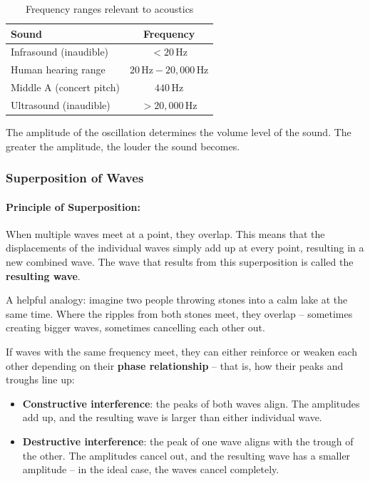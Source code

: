 \begin{table}[h]
\centering
\begin{tabular}{|l|c|}
\hline
\textbf{Sound} & \textbf{Frequency} \\
\hline
Infrasound (inaudible) & $< 20\,\text{Hz}$ \\
Human hearing range   & $20\,\text{Hz} - 20{,}000\,\text{Hz}$ \\
Middle A (concert pitch) & $440\,\text{Hz}$ \\
Ultrasound (inaudible) & $> 20{,}000\,\text{Hz}$ \\
\hline
\end{tabular}
\caption{Frequency ranges relevant to acoustics}
\label{tab:frequencies}
\end{table}
The amplitude of the oscillation determines the volume level of the sound. The greater the amplitude, the louder the sound becomes.

\subsubsection{Superposition of Waves}

\paragraph{Principle of Superposition:}
When multiple waves meet at a point, they overlap. This means that the displacements of the individual waves simply add up at every point, resulting in a new combined wave. The wave that results from this superposition is called the \textbf{resulting wave}.

A helpful analogy: imagine two people throwing stones into a calm lake at the same time. Where the ripples from both stones meet, they overlap -- sometimes creating bigger waves, sometimes cancelling each other out.

If waves with the same frequency meet, they can either reinforce or weaken each other depending on their \textbf{phase relationship} -- that is, how their peaks and troughs line up:

\begin{itemize}
    \item \textbf{Constructive interference}: the peaks of both waves align. The amplitudes add up, and the resulting wave is larger than either individual wave.
    \item \textbf{Destructive interference}: the peak of one wave aligns with the trough of the other. The amplitudes cancel out, and the resulting wave has a smaller amplitude -- in the ideal case, the waves cancel completely.
\end{itemize}


